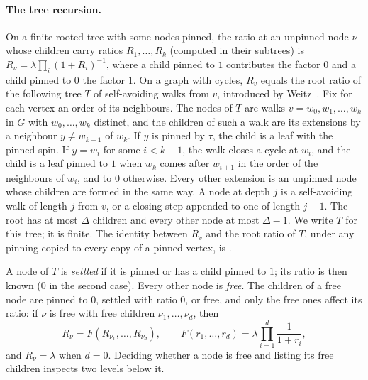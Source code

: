 \documentclass[11pt]{amsart}
\begin{document}
\paragraph{The tree recursion.} On a finite rooted tree with some nodes pinned, the ratio at an unpinned node $\nu$ whose children carry ratios $R_1,\dots,R_k$ (computed in their subtrees) is $R_\nu=\lambda\prod_i(1+R_i)^{-1}$, where a child pinned to $1$ contributes the factor $0$ and a child pinned to $0$ the factor $1$. On a graph with cycles, $R_v$ equals the root ratio of the following tree $T$ of self-avoiding walks from $v$, introduced by Weitz~\cite{W06}.
Fix for each vertex an order of its neighbours. The nodes of $T$ are walks $v=w_0,w_1,\dots,w_k$ in $G$ with $w_0,\dots,w_k$ distinct, and the children of such a walk are its extensions by a neighbour $y\ne w_{k-1}$ of $w_k$. If $y$ is pinned by $\tau$, the child is a leaf with the pinned spin. If $y=w_i$ for some $i<k-1$, the walk closes a cycle at $w_i$, and the child is a leaf pinned to $1$ when $w_k$ comes after $w_{i+1}$ in the order of the neighbours of $w_i$, and to $0$ otherwise. Every other extension is an unpinned node whose children are formed in the same way. A node at depth $j$ is a self-avoiding walk of length $j$ from $v$, or a closing step appended to one of length $j-1$. The root has at most $\Delta$ children and every other node at most $\Delta-1$. We write $T$ for this tree; it is finite. The identity between $R_v$ and the root ratio of $T$, under any pinning copied to every copy of a pinned vertex, is \cite[Theorem~3.1]{W06}.

A node of $T$ is \emph{settled} if it is pinned or has a child pinned to $1$; its ratio is then known ($0$ in the second case). Every other node is \emph{free}. The children of a free node are pinned to $0$, settled with ratio $0$, or free, and only the free ones affect its ratio: if $\nu$ is free with free children $\nu_1,\dots,\nu_d$, then
\[
R_\nu=F(R_{\nu_1},\dots,R_{\nu_d}),\qquad F(r_1,\dots,r_d)=\lambda\prod_{i=1}^d\frac1{1+r_i},
\]
and $R_\nu=\lambda$ when $d=0$. Deciding whether a node is free and listing its free children inspects two levels below it.
\end{document}
